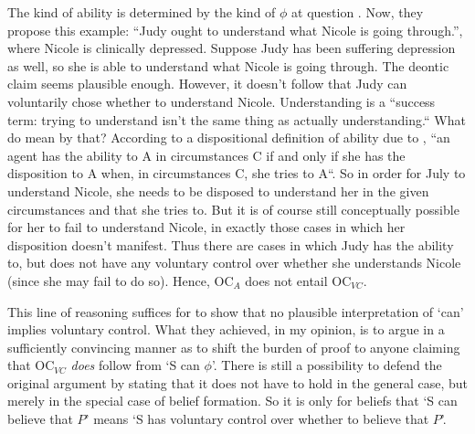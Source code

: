 \documentclass[12pt,numbers=noenddot]{scrartcl}
\begin{document}
 The kind of ability is determined by the kind of $\phi$ at question \autocite[617]{Chuard2009-CHUENW}. Now, they propose this example: “Judy ought to understand what Nicole is going through.”, where Nicole is clinically depressed. Suppose Judy has been suffering depression as well, so she is able to understand what Nicole is going through. The deontic claim seems plausible enough. However, it doesn't follow that Judy can voluntarily chose whether to understand Nicole. Understanding is a “success term: trying to understand isn’t the same thing as actually understanding.“ What do \textcite[617]{Chuard2009-CHUENW} mean by that? According to a dispositional definition of ability due to \textcite[848]{Fara2008-FARMAA}, “an agent has the ability to A in circumstances C if and only if she has the disposition to A when, in circumstances C, she tries to A“. So in order for July to understand Nicole, she needs to be disposed to understand her in the given circumstances and that she tries to. But it is of course still conceptually possible for her to fail to understand Nicole, in exactly those cases in which her disposition doesn't manifest. Thus there are cases in which Judy has the ability to, but does not have any voluntary control over whether she understands Nicole (since she may fail to do so). Hence, OC$_A$ does not entail OC$_{VC}$.

This line of reasoning suffices for \textcite[618]{Chuard2009-CHUENW} to show that no plausible interpretation of ‘can’ implies voluntary control. What they achieved, in my opinion, is to argue in a sufficiently convincing manner as to shift the burden of proof to anyone claiming that OC$_{VC}$ \emph{does} follow from ‘S can $\phi$’. There is still a possibility to defend the original argument by stating that it does not have to hold in the general case, but merely in the special case of belief formation. So it is only for beliefs that ‘S can believe that $P$’ means ‘S has voluntary control over whether to believe that $P$’.
\end{document}
